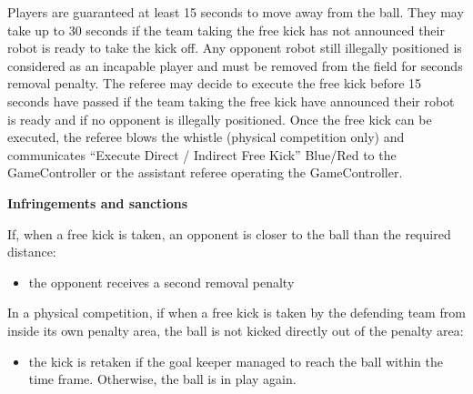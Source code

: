 Players are guaranteed at least 15 seconds to move away from the ball.
They may take up to 30 seconds if the team taking the free kick has not
announced their robot is ready to take the kick off.
Any opponent robot still illegally positioned is considered as an incapable
player and must be removed from the field for  seconds removal penalty.
The referee may decide to execute the free kick before 15 seconds have passed if
the team taking the free kick have announced their robot is ready and if no
opponent is illegally positioned.
Once the free kick can be executed, the referee blows the whistle (physical competition only) and communicates ``Execute Direct / Indirect Free Kick'' Blue/Red to the GameController or the assistant referee operating the GameController.

\bigskip

{\bfseries Infringements and sanctions}

\headlinebox

If, when a free kick is taken, an opponent is closer to the ball than the required distance:

\begin{itemize}
\item the opponent receives a  second removal penalty 
\end{itemize}


    In a physical competition, if when a free kick is taken by the defending team from inside its own
    penalty area, the ball is not kicked directly out of the penalty area:

  \begin{itemize}
  \item the kick is retaken if the goal keeper
      managed to reach the ball within the time frame. Otherwise, the ball is in
      play again.
  \end{itemize}
  \bigskip


